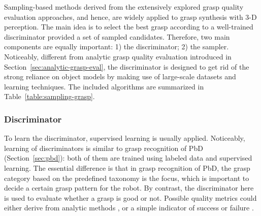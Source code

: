 \documentclass[letterpaper,10pt]{article}
\newcommand{\secref}[1]{Section~\ref{#1}}
\newcommand{\tabref}[1]{Table~\ref{#1}}
\begin{document}
\begin{table}[t]
\begin{center}
\begin{tabularx}{1\columnwidth}{m{4cm}m{1.3cm}<{\centering}m{2cm}<{\centering}m{2cm}<{\centering}m{2.7cm}<{\centering}m{1.6cm}<{\centering}}
\bottomrule
\end{tabularx}
\end{center}
\vspace{-15pt}
\end{table}

Sampling-based methods derived from the extensively explored grasp quality evaluation approaches, and hence, are widely applied to grasp synthesis with 3-D perception.
The main idea is to select the best grasp according to a well-trained discriminator provided a set of sampled candidates.
Therefore, two main components are equally important: 1) the discriminator; 2) the sampler.
Noticeably, different from analytic grasp quality evaluation introduced in \secref{sec:analytic-grasp-eval}, the discriminator is designed to get rid of the strong reliance on object models by making use of large-scale datasets and learning techniques.
The included algorithms are summarized in \tabref{table:sampling-grasp}.

\subsubsection{Discriminator}

To learn the discriminator, supervised learning is usually applied.
Noticeably, learning of discriminators is similar to grasp recognition of PbD (\secref{sec:pbd}): both of them are trained using labeled data and supervised learning.
The essential difference is that in grasp recognition of PbD, the grasp category based on the predefined taxonomy is the focus, which is important to decide a certain grasp pattern for the robot.
By contrast, the discriminator here is used to evaluate whether a grasp is good or not.
Possible quality metrics could either derive from analytic methods \cite{roa2015grasp}, or a simple indicator of success or failure \cite{saxena2006robotic, saxena2008robotic}.
\end{document}
